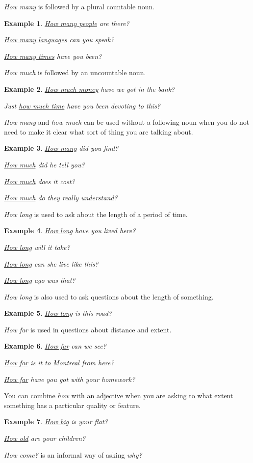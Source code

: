 \documentclass[oneside]{book}
\numberwithin{equation}{section}
\newtheorem{example}{Example}[section]
\begin{document}
%
\textit{How many} is followed by a plural countable noun.
\begin{example}
    \underline{How many people} are there?
    
    \underline{How many languages} can you speak?
    
    \underline{How many times} have you been?
\end{example}
\textit{How much} is followed by an uncountable noun.
\begin{example}
    \underline{How much money} have we got in the bank?
    
    Just \underline{how much time} have you been devoting to this?
\end{example}
\textit{How many} and \textit{how much} can be used without a following noun when you do not need to make it clear what sort of thing you are talking about.
\begin{example}
    \underline{How many} did you find?
    
    \underline{How much} did he tell you?
    
    \underline{How much} does it cost?
    
    \underline{How much} do they really understand?
\end{example}
\textit{How long} is used to ask about the length of a period of time.
\begin{example}
    \underline{How long} have you lived here?
    
    \underline{How long} will it take?
    
    \underline{How long} can she live like this?
    
    \underline{How long} ago was that?
\end{example}
\textit{How long} is also used to ask questions about the length of something.
\begin{example}
    \underline{How long} is this road?
\end{example}
\textit{How far} is used in questions about distance and extent.
\begin{example}
    \underline{How far} can we see?
    
    \underline{How far} is it to Montreal from here?
    
    \underline{How far} have you got with your homework?
\end{example}
You can combine \textit{how} with an adjective when you are asking to what extent something has a particular quality or feature.
\begin{example}
    \underline{How big} is your flat?
    
    \underline{How old} are your children?
\end{example}
\textit{How come?} is an informal way of asking \textit{why?}
\end{document}
